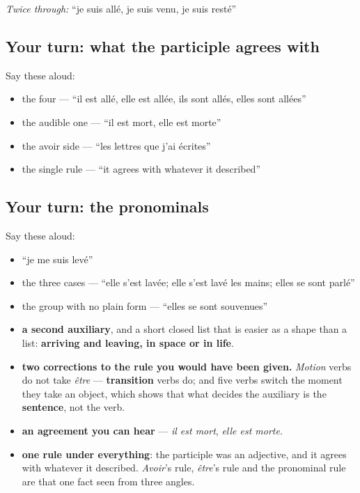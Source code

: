 \emph{Twice through:} \textquotedblleft{}je suis allé, je suis venu, je suis resté\textquotedblright{}

\subsection*{Your turn: what the participle agrees with}
Say these aloud:

\begin{itemize}
\raggedright
  \item the four — \textquotedblleft{}il est allé, elle est allée, ils sont allés, elles sont allées\textquotedblright{}
  \item the audible one — \textquotedblleft{}il est mort, elle est morte\textquotedblright{}
  \item the avoir side — \textquotedblleft{}les lettres que j'ai écrites\textquotedblright{}
  \item the single rule — \textquotedblleft{}it agrees with whatever it described\textquotedblright{}
\end{itemize}

\subsection*{Your turn: the pronominals}
Say these aloud:

\begin{itemize}
\raggedright
  \item \textquotedblleft{}je me suis levé\textquotedblright{}
  \item the three cases — \textquotedblleft{}elle s'est lavée; elle s'est lavé les mains; elles se sont parlé\textquotedblright{}
  \item the group with no plain form — \textquotedblleft{}elles se sont souvenues\textquotedblright{}
\end{itemize}

\begin{grammarlens}[title={What you've built this chapter}]
\begin{itemize}
\raggedright
  \item \textbf{a second auxiliary}, and a short closed list that is easier as a shape than a list: \textbf{arriving and leaving, in space or in life}.
  \item \textbf{two corrections to the rule you would have been given.} \emph{Motion} verbs do not take \emph{être} — \textbf{transition} verbs do; and five verbs switch the moment they take an object, which shows that what decides the auxiliary is the \textbf{sentence}, not the verb.
  \item \textbf{an agreement you can hear} — \emph{il est mort}, \emph{elle est morte}.
  \item \textbf{one rule under everything}: the participle was an adjective, and it agrees with whatever it described. \emph{Avoir}'s rule, \emph{être}'s rule and the pronominal rule are that one fact seen from three angles.
\end{itemize}
\end{grammarlens}

